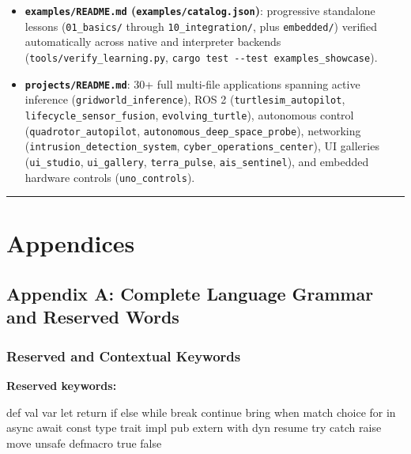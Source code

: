 \documentclass[
  english,
  oneside]{book}
\newenvironment{Shaded}{\begin{snugshade}}{\end{snugshade}}
\newcommand{\NormalTok}[1]{\textcolor[rgb]{0.83,0.83,0.83}{#1}}
\providecommand{\tightlist}{%
  \setlength{\itemsep}{0pt}\setlength{\parskip}{0pt}}
\begin{document}
\begin{itemize}
\tightlist
\item
  \textbf{\texttt{examples/README.md} (\texttt{examples/catalog.json})}:
  progressive standalone lessons (\texttt{01\_basics/} through
  \texttt{10\_integration/}, plus \texttt{embedded/}) verified
  automatically across native and interpreter backends
  (\texttt{tools/verify\_learning.py},
  \texttt{cargo\ test\ -\/-test\ examples\_showcase}).
\item
  \textbf{\texttt{projects/README.md}}: 30+ full multi-file applications
  spanning active inference (\texttt{gridworld\_inference}), ROS 2
  (\texttt{turtlesim\_autopilot}, \texttt{lifecycle\_sensor\_fusion},
  \texttt{evolving\_turtle}), autonomous control
  (\texttt{quadrotor\_autopilot},
  \texttt{autonomous\_deep\_space\_probe}), networking
  (\texttt{intrusion\_detection\_system},
  \texttt{cyber\_operations\_center}), UI galleries
  (\texttt{ui\_studio}, \texttt{ui\_gallery}, \texttt{terra\_pulse},
  \texttt{ais\_sentinel}), and embedded hardware controls
  (\texttt{uno\_controls}).
\end{itemize}

\begin{center}\rule{0.5\linewidth}{0.5pt}\end{center}

\part{Appendices}\label{appendices}

\chapter{Appendix A: Complete Language Grammar and Reserved
Words}\label{appendix-a-complete-language-grammar-and-reserved-words}

\section{Reserved and Contextual
Keywords}\label{reserved-and-contextual-keywords}

\textbf{Reserved keywords:}

\begin{Shaded}
\begin{Highlighting}[]
\NormalTok{def      val      var      let      return   if       else     while}
\NormalTok{break    continue bring    when     match    choice   for      in}
\NormalTok{async    await    const    type     trait    impl     pub      extern}
\NormalTok{with     dyn      resume   try      catch    raise    move     unsafe}
\NormalTok{defmacro true     false}
\end{Highlighting}
\end{Shaded}
\end{document}
